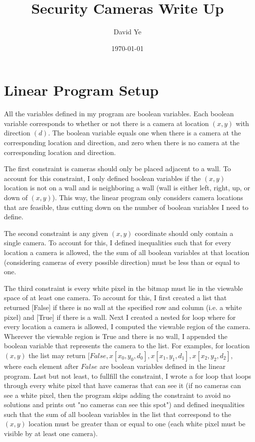 \documentclass[11pt]{article}
\title{Security Cameras Write Up}
\author{David Ye}
\date{\today}
\begin{document}
\maketitle
\section{Linear Program Setup}
All the variables defined in my program are boolean variables. Each boolean variable corresponds to whether or not there is a camera at location $(x,y)$ with direction $(d)$. The boolean variable equals one when there is a camera at the corresponding location and direction, and zero when there is no camera at the corresponding location and direction.

The first constraint is cameras should only be placed adjacent to a wall. To account for this constraint, I only defined boolean variables if the $(x,y)$ location is not on a wall and is neighboring a wall (wall is either left, right, up, or down of $(x,y)$). This way, the linear program only considers camera locations that are feasible, thus cutting down on the number of boolean variables I need to define.

The second constraint is any given $(x,y)$ coordinate should only contain a single camera. To account for this, I defined inequalities such that for every location a camera is allowed, the the sum of all boolean variables at that location (considering cameras of every possible direction) must be less than or equal to one.

The third constraint is every white pixel in the bitmap must lie in the viewable space of at least one camera. To account for this, I first created a list that returned [False] if there is no wall at the specified row and column (i.e. a white pixel) and [True] if there is a wall. Next I created a nested for loop where for every location a camera is allowed, I computed the viewable region of the camera. Wherever the viewable region is True and there is no wall, I appended the boolean variable that represents the camera to the list. For examples, for location $(x,y)$ the list may return $[False, x[x_0,y_0,d_0], x[x_1,y_1,d_1], x[x_2,y_2,d_2]$, where each element after $False$ are boolean variables defined in the linear program. Last but not least, to fullfill the constraint, I wrote a for loop that loops through every white pixel that have cameras that can see it (if no cameras can see a white pixel, then the program skips adding the constraint to avoid no solutions and prints out "no cameras can see this spot") and defined inequalities such that the sum of all boolean variables in the list that correspond to the $(x,y)$ location must be greater than or equal to one (each white pixel must be visible by at least one camera).
\end{document}
